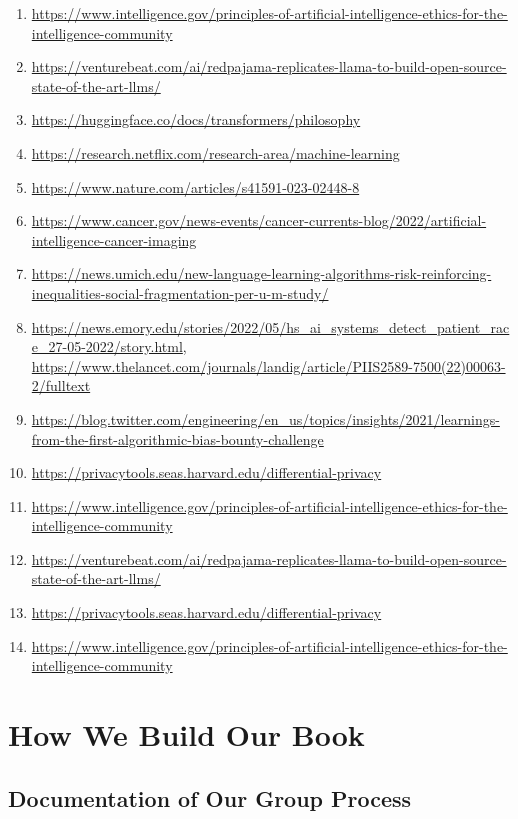 \documentclass[
]{book}
\begin{document}
\begin{enumerate}
\item
  \url{https://www.intelligence.gov/principles-of-artificial-intelligence-ethics-for-the-intelligence-community}
\item
  \url{https://venturebeat.com/ai/redpajama-replicates-llama-to-build-open-source-state-of-the-art-llms/}
\item
  \url{https://huggingface.co/docs/transformers/philosophy}
\item
  \url{https://research.netflix.com/research-area/machine-learning}
\item
  \url{https://www.nature.com/articles/s41591-023-02448-8}
\item
  \url{https://www.cancer.gov/news-events/cancer-currents-blog/2022/artificial-intelligence-cancer-imaging}
\item
  \url{https://news.umich.edu/new-language-learning-algorithms-risk-reinforcing-inequalities-social-fragmentation-per-u-m-study/}
\item
  \url{https://news.emory.edu/stories/2022/05/hs_ai_systems_detect_patient_race_27-05-2022/story.html}, \url{https://www.thelancet.com/journals/landig/article/PIIS2589-7500(22)00063-2/fulltext}
\item
  \url{https://blog.twitter.com/engineering/en_us/topics/insights/2021/learnings-from-the-first-algorithmic-bias-bounty-challenge}
\item
  \url{https://privacytools.seas.harvard.edu/differential-privacy}
\item
  \url{https://www.intelligence.gov/principles-of-artificial-intelligence-ethics-for-the-intelligence-community}
\item
  \url{https://venturebeat.com/ai/redpajama-replicates-llama-to-build-open-source-state-of-the-art-llms/}
\item
  \url{https://privacytools.seas.harvard.edu/differential-privacy}
\item
  \url{https://www.intelligence.gov/principles-of-artificial-intelligence-ethics-for-the-intelligence-community}
\end{enumerate}

\hypertarget{how-we-build-our-book}{%
\chapter{How We Build Our Book}\label{how-we-build-our-book}}

\hypertarget{documentation-of-our-group-process}{%
\section{Documentation of Our Group Process}\label{documentation-of-our-group-process}}
\end{document}
